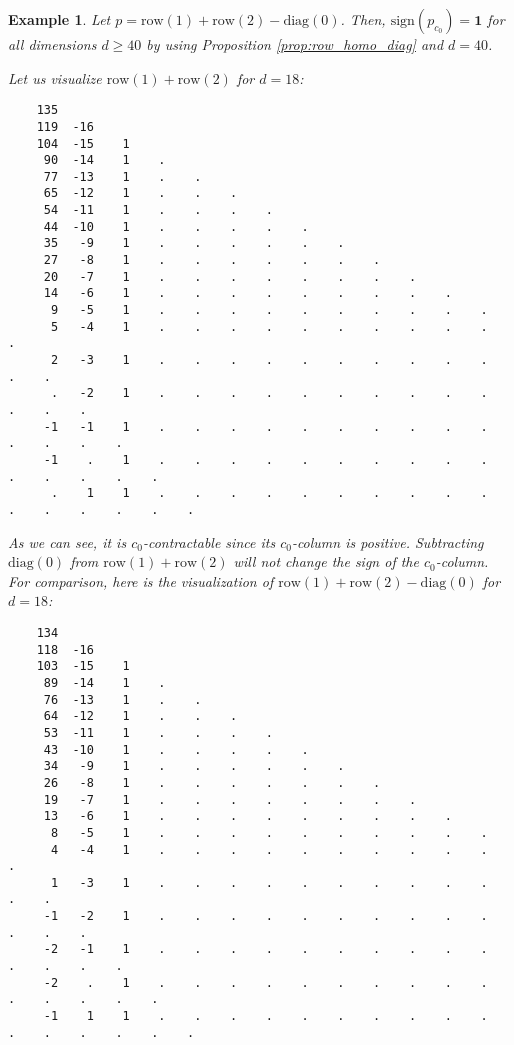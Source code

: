 \documentclass[11pt]{article}
\newtheorem{example}[theorem]{Example}
\begin{document}
\begin{example}
  Let \( p = \mathrm{row}(1) + \mathrm{row}(2) - \mathrm{diag}(0)\).
  Then, \( \mathrm{sign}(p_{c_0}) = \mathbf 1 \) for all dimensions \( d \geq 40 \) by using Proposition \ref{prop:row_homo_diag} and \( d = 40 \).

  Let us visualize \( \mathrm{row}(1) + \mathrm{row}(2) \) for \( d = 18 \):
  \begingroup
  \fontsize{8pt}{10pt}\selectfont
  \begin{verbatim}
    135 
    119  -16 
    104  -15    1 
     90  -14    1    . 
     77  -13    1    .    . 
     65  -12    1    .    .    . 
     54  -11    1    .    .    .    . 
     44  -10    1    .    .    .    .    . 
     35   -9    1    .    .    .    .    .    . 
     27   -8    1    .    .    .    .    .    .    . 
     20   -7    1    .    .    .    .    .    .    .    . 
     14   -6    1    .    .    .    .    .    .    .    .    . 
      9   -5    1    .    .    .    .    .    .    .    .    .    . 
      5   -4    1    .    .    .    .    .    .    .    .    .    .    . 
      2   -3    1    .    .    .    .    .    .    .    .    .    .    .    . 
      .   -2    1    .    .    .    .    .    .    .    .    .    .    .    .    . 
     -1   -1    1    .    .    .    .    .    .    .    .    .    .    .    .    .    . 
     -1    .    1    .    .    .    .    .    .    .    .    .    .    .    .    .    .    . 
      .    1    1    .    .    .    .    .    .    .    .    .    .    .    .    .    .    .    .
  \end{verbatim}
  \endgroup
  As we can see, it is \( c_0 \)-contractable since its \( c_0 \)-column is positive. Subtracting \( \mathrm{diag}(0) \) from \( \mathrm{row}(1) + \mathrm{row}(2) \) will not change the sign of the \( c_0 \)-column. For comparison, here is the visualization of \( \mathrm{row}(1) + \mathrm{row}(2) - \mathrm{diag}(0) \) for \( d = 18 \):
  \begingroup
  \fontsize{8pt}{10pt}\selectfont
  \begin{verbatim}
    134 
    118  -16 
    103  -15    1 
     89  -14    1    . 
     76  -13    1    .    . 
     64  -12    1    .    .    . 
     53  -11    1    .    .    .    . 
     43  -10    1    .    .    .    .    . 
     34   -9    1    .    .    .    .    .    . 
     26   -8    1    .    .    .    .    .    .    . 
     19   -7    1    .    .    .    .    .    .    .    . 
     13   -6    1    .    .    .    .    .    .    .    .    . 
      8   -5    1    .    .    .    .    .    .    .    .    .    . 
      4   -4    1    .    .    .    .    .    .    .    .    .    .    . 
      1   -3    1    .    .    .    .    .    .    .    .    .    .    .    . 
     -1   -2    1    .    .    .    .    .    .    .    .    .    .    .    .    . 
     -2   -1    1    .    .    .    .    .    .    .    .    .    .    .    .    .    . 
     -2    .    1    .    .    .    .    .    .    .    .    .    .    .    .    .    .    . 
     -1    1    1    .    .    .    .    .    .    .    .    .    .    .    .    .    .    .    . 
     \end{verbatim}
  \endgroup
\end{example}
\end{document}

